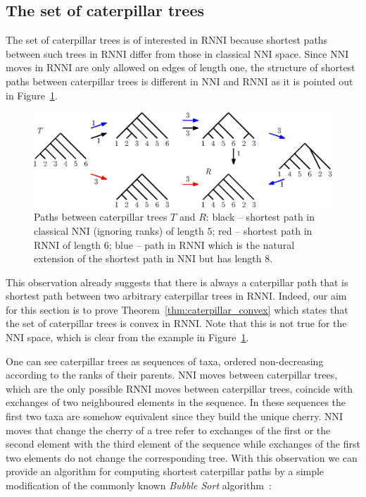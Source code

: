 \documentclass[11pt, a4paper]{article}
\newcommand{\nni}{\mathrm{NNI}}
\newcommand{\rnni}{\mathrm{RNNI}}
\begin{document}
\subsection{The set of caterpillar trees}
\label{section:caterpillar_convex}

The set of caterpillar trees is of interested in $\rnni$ because shortest paths between such trees in $\rnni$ differ from those in classical $\nni$ space.
Since $\nni$ moves in $\rnni$ are only allowed on edges of length one, the structure of shortest paths between caterpillar trees is different in $\nni$ and $\rnni$ as it is pointed out in Figure~\ref{fig:NNI_vs_RNNI}.

\begin{figure}[H]
	\centering
	\includegraphics[width=\textwidth]{NNI_vs_RNNI}
	\caption{Paths between caterpillar trees $T$ and $R$: black -- shortest path in classical $\nni$ (ignoring ranks) of length $5$; red -- shortest path in $\rnni$ of length $6$; blue -- path in $\rnni$ which is the natural extension of the shortest path in $\nni$ but has length $8$.}
	\label{fig:NNI_vs_RNNI}
\end{figure}

This observation already suggests that there is always a caterpillar path that is shortest path between two arbitrary caterpillar trees in $\rnni$.
Indeed, our aim for this section is to prove Theorem~\ref{thm:caterpillar_convex} which states that the set of caterpillar trees is convex in $\rnni$.
Note that this is not true for the $\nni$ space, which is clear from the example in Figure~\ref{fig:NNI_vs_RNNI}.

One can see caterpillar trees as sequences of taxa, ordered non-decreasing according to the ranks of their parents.
$\nni$ moves between caterpillar trees, which are the only possible $\rnni$ moves between caterpillar trees, coincide with exchanges of two neighboured elements in the sequence.
In these sequences the first two taxa are somehow equivalent since they build the unique cherry.
$\nni$ moves that change the cherry of a tree refer to exchanges of the first or the second element with the third element of the sequence while exchanges of the first two elements do not change the corresponding tree.
With this observation we can provide an algorithm for computing shortest caterpillar paths by a simple modification of the commonly known \emph{Bubble Sort} algorithm~\cite{knuth1997}:
\end{document}
